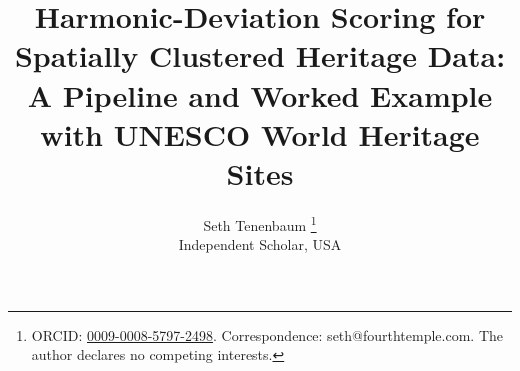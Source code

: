 \documentclass[12pt,a4paper]{article}
\begin{document}

\title{Harmonic-Deviation Scoring for Spatially Clustered Heritage Data:\\[4pt]
A Pipeline and Worked Example with UNESCO World Heritage Sites}

\author{Seth Tenenbaum%
  \thanks{ORCID: \href{https://orcid.org/0009-0008-5797-2498}{0009-0008-5797-2498}.
  Correspondence: seth@fourthtemple.com. The author declares no competing interests.}\\[2pt]
  \small Independent Scholar, USA}

\date{}
\maketitle
\end{document}

